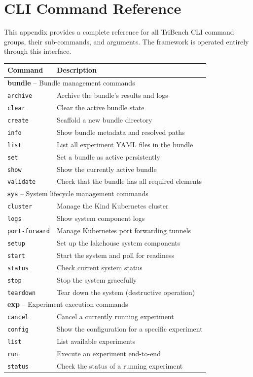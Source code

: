 \chapter{CLI Command Reference}
\label{ch:appendix_cli}

This appendix provides a complete reference for all TriBench CLI command groups, their sub-commands, and arguments. The framework is operated entirely through this interface.

\begin{table}[H]
\centering
\small
\begin{tabular}{p{2.5cm}p{11.5cm}}
\hline
\textbf{Command} & \textbf{Description} \\
\hline
\multicolumn{2}{l}{\textbf{bundle} -- Bundle management commands} \\
\hline
\texttt{archive}   & Archive the bundle's results and logs \\
\texttt{clear}     & Clear the active bundle state \\
\texttt{create}    & Scaffold a new bundle directory \\
\texttt{info}      & Show bundle metadata and resolved paths \\
\texttt{list}      & List all experiment YAML files in the bundle \\
\texttt{set}       & Set a bundle as active persistently \\
\texttt{show}      & Show the currently active bundle \\
\texttt{validate}  & Check that the bundle has all required elements \\
\hline
\multicolumn{2}{l}{\textbf{sys} -- System lifecycle management commands} \\
\hline
\texttt{cluster}   & Manage the Kind Kubernetes cluster \\
\texttt{logs}      & Show system component logs \\
\texttt{port-forward} & Manage Kubernetes port forwarding tunnels \\
\texttt{setup}     & Set up the lakehouse system components \\
\texttt{start}     & Start the system and poll for readiness \\
\texttt{status}    & Check current system status \\
\texttt{stop}      & Stop the system gracefully \\
\texttt{teardown}  & Tear down the system (destructive operation) \\
\hline
\multicolumn{2}{l}{\textbf{exp} -- Experiment execution commands} \\
\hline
\texttt{cancel}    & Cancel a currently running experiment \\
\texttt{config}    & Show the configuration for a specific experiment \\
\texttt{list}      & List available experiments \\
\texttt{run}       & Execute an experiment end-to-end \\
\texttt{status}    & Check the status of a running experiment \\
\hline
\end{tabular}
\end{table}

